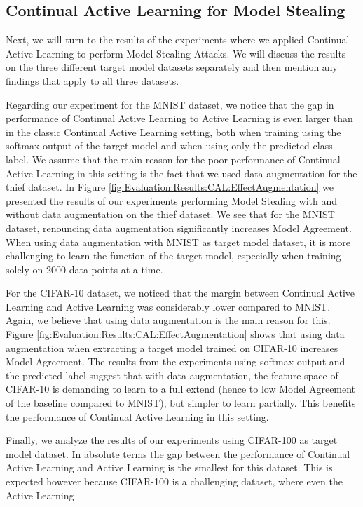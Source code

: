 \subsection{Continual Active Learning for Model Stealing}
\label{sec:Discussion:ModelStealing:CALMS}
Next, we will turn to the results of the experiments where we applied Continual Active Learning to perform Model Stealing Attacks. We will discuss the results on the
three different target model datasets separately and then mention any findings that apply to all three datasets. \par
Regarding our experiment for the MNIST dataset, we notice that the gap in performance of Continual Active Learning to Active Learning is even larger than in the
classic Continual Active Learning setting, both when training using the softmax output of the target model and when using only the predicted class label. We assume that
the main reason for the poor performance of Continual Active Learning in this setting is the fact that we used data augmentation for the thief dataset. In Figure 
\ref{fig:Evaluation:Results:CAL:EffectAugmentation} we presented the results of our experiments performing Model Stealing with and without data augmentation on the
thief dataset. We see that for the MNIST dataset, renouncing data augmentation significantly increases Model Agreement. When using data augmentation with MNIST as
target model dataset, it is more challenging to learn the function of the target model, especially when training solely on 2000 data points at a time. \par
For the CIFAR-10 dataset, we noticed that the margin between Continual Active Learning and Active Learning was considerably lower compared to MNIST. Again, we believe
that using data augmentation is the main reason for this. Figure \ref{fig:Evaluation:Results:CAL:EffectAugmentation} shows that using data augmentation when extracting
a target model trained on CIFAR-10 increases Model Agreement. The results from the experiments using softmax output and the predicted label suggest that with data
augmentation, the feature space of CIFAR-10 is demanding to learn to a full extend (hence to low Model Agreement of the baseline compared to MNIST), but simpler to
learn partially. This benefits the performance of Continual Active Learning in this setting. \par
Finally, we analyze the results of our experiments using CIFAR-100 as target model dataset. In absolute terms the gap between the performance of Continual Active
Learning and Active Learning is the smallest for this dataset. This is expected however because CIFAR-100 is a challenging dataset, where even the Active Learning
